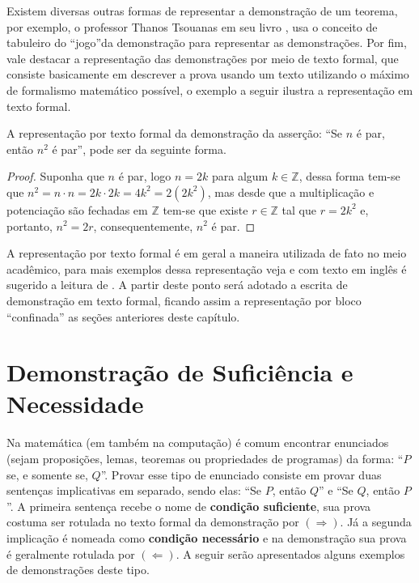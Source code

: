 Existem diversas outras formas de representar a demonstração de um teorema, por exemplo, o professor Thanos Tsouanas em seu livro \cite{fmcbook}, usa o conceito de tabuleiro do ``jogo''da demonstração para representar as demonstrações. Por fim, vale destacar a representação das demonstrações por meio de texto formal, que consiste basicamente em descrever a prova usando um texto utilizando o máximo de formalismo matemático possível, o exemplo a seguir ilustra a representação em texto formal.

\begin{exemplo}
	A representação por texto formal da demonstração da asserção: ``Se $n$ é par, então $n^2$ é par'', pode ser da seguinte forma.
	\begin{proof}
		Suponha que $n$ é par, logo $n = 2k$ para algum $k \in \mathbb{Z}$, dessa forma tem-se que $n^2 = n \cdot n = 2k \cdot 2k = 4k^2 = 2(2k^2)$, mas desde que a multiplicação e potenciação são fechadas em $\mathbb{Z}$ tem-se que existe $r \in \mathbb{Z}$ tal que $r = 2k^2$ e, portanto, $n^2 = 2r$, consequentemente,  $n^2$ é par.
	\end{proof}
\end{exemplo}

A representação por texto formal é em geral a maneira utilizada de fato no meio acadêmico, para mais exemplos dessa representação veja \cite{valdi2016master, valdi2020phd, annax2019phd, thadeu2021phd, rui2019phd} e com texto em inglês é sugerido a leitura de \cite{vania2019phd, velleman2019comProvar}. A partir deste ponto será adotado a escrita de demonstração em texto formal, ficando assim a representação por bloco ``confinada'' as seções anteriores deste capítulo.

\section{Demonstração de Suficiência e Necessidade}

Na matemática (em também na computação) é comum encontrar enunciados (sejam proposições, lemas, teoremas ou propriedades de programas) da forma: ``$P$ se, e somente se, $Q$''. Provar esse tipo de enunciado consiste em  provar duas sentenças implicativas em separado, sendo elas: ``Se $P$, então $Q$'' e ``Se $Q$, então $P$''.  A primeira sentença recebe o nome de \textbf{condição suficiente}, sua prova costuma ser rotulada no texto formal da demonstração por $(\Rightarrow)$. Já a segunda implicação é nomeada como \textbf{condição necessário} e na demonstração sua prova é geralmente rotulada por $(\Leftarrow)$. A seguir serão apresentados alguns exemplos de demonstrações deste tipo.


